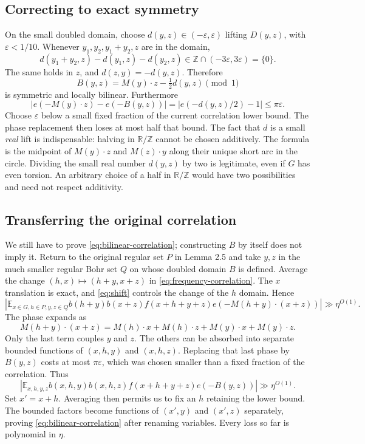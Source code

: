 \documentclass[11pt,a4paper]{article}
\newcommand{\E}{\mathbb E}
\newcommand{\T}{\mathbb R/\mathbb Z}
\newcommand{\Z}{\mathbb Z}
\newcommand{\abs}[1]{\left|#1\right|}
\newcommand{\poly}{\eta^{O(1)}}
\theoremstyle{definition}
\numberwithin{equation}{section}
\begin{document}
\subsection{Correcting to exact symmetry}
On the small doubled domain, choose $d(y,z)\in(-\varepsilon,\varepsilon)$
lifting $D(y,z)$, with $\varepsilon<1/10$. Whenever $y_1,y_2,y_1+y_2,z$
are in the domain,
\[d(y_1+y_2,z)-d(y_1,z)-d(y_2,z)\in\Z\cap(-3\varepsilon,3\varepsilon)=\{0\}.\]
The same holds in $z$, and $d(z,y)=-d(y,z)$. Therefore
\[B(y,z)=M(y)\cdot z-\tfrac12d(y,z)\pmod1\]
is symmetric and locally bilinear. Furthermore
\[|e(-M(y)\cdot z)-e(-B(y,z))|
=|e(-d(y,z)/2)-1|\leq\pi\varepsilon.\]
Choose $\varepsilon$ below a small fixed fraction of the current
correlation lower bound. The phase replacement then loses at most half
that bound. The fact that $d$ is a small \emph{real} lift is indispensable:
halving in $\T$ cannot be chosen additively.
The formula is the midpoint of $M(y)\cdot z$ and $M(z)\cdot y$
along their unique short arc in the circle. Dividing the small real
number $d(y,z)$ by two is legitimate, even if $G$ has even torsion.
An arbitrary choice of a half in $\T$ would have two possibilities and
need not respect additivity.

\subsection{Transferring the original correlation}
We still have to prove \eqref{eq:bilinear-correlation}; constructing
$B$ by itself does not imply it. Return to the original regular set
$P$ in Lemma 2.5 and take $y,z$ in the much smaller regular Bohr set
$Q$ on whose doubled domain $B$ is defined. Average the change
$(h,x)\mapsto(h+y,x+z)$ in \eqref{eq:frequency-correlation}.
The $x$ translation is exact, and \eqref{eq:shift} controls the change
of the $h$ domain. Hence
\[
\abs{\E_{x\in G,h\in P,y,z\in Q}
b(h+y)b(x+z)f(x+h+y+z)e(-M(h+y)\cdot(x+z))}\gg\poly.
\]
The phase expands as
\[
M(h+y)\cdot(x+z)=M(h)\cdot x+M(h)\cdot z+M(y)\cdot x+M(y)\cdot z.
\]
Only the last term couples $y$ and $z$. The others can be absorbed
into separate bounded functions of $(x,h,y)$ and $(x,h,z)$.
Replacing that last phase by $B(y,z)$ costs at most $\pi\varepsilon$,
which was chosen smaller than a fixed fraction of the correlation.
Thus
\[
\abs{\E_{x,h,y,z}b(x,h,y)b(x,h,z)
f(x+h+y+z)e(-B(y,z))}\gg\poly.
\]
Set $x'=x+h$. Averaging then permits us to fix an $h$ retaining the
lower bound. The bounded factors become functions of $(x',y)$ and
$(x',z)$ separately, proving \eqref{eq:bilinear-correlation} after
renaming variables. Every loss so far is polynomial in $\eta$.
\end{document}
